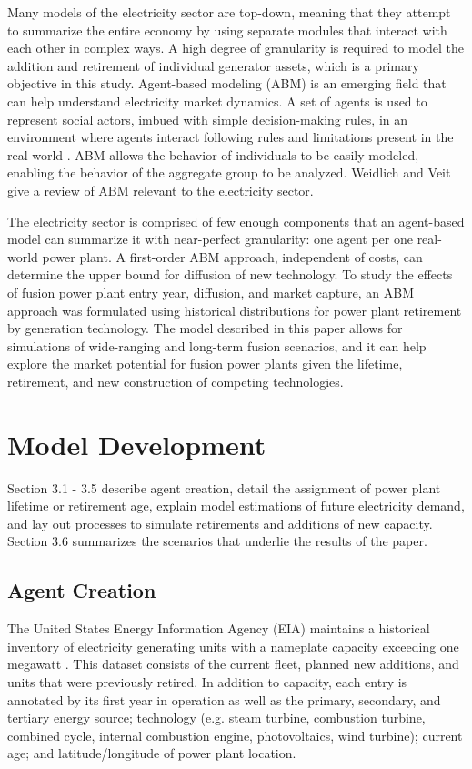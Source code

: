 \documentclass[review]{elsarticle}
\begin{document}
Many models of the electricity sector are top-down, meaning that they attempt to summarize the entire economy by using separate modules that interact with each other in complex ways. A high degree of granularity is required to model the addition and retirement of individual generator assets, which is a primary objective in this study. Agent-based modeling (ABM) is an emerging field that can help understand electricity market dynamics. A set of agents is used to represent social actors, imbued with simple decision-making rules, in an environment where agents interact following rules and limitations present in the real world \citep{Gilbert2008}.  ABM allows the behavior of individuals to be easily modeled, enabling the behavior of the aggregate group to be analyzed. Weidlich and Veit \citep{Widlich2008} give a review of ABM relevant to the electricity sector.

The electricity sector is comprised of few enough components that an agent-based model can summarize it with near-perfect granularity: one agent per one real-world power plant. A first-order ABM approach, independent of costs, can determine the upper bound for diffusion of new technology. To study the effects of fusion power plant entry year, diffusion, and market capture, an ABM approach was formulated using historical distributions for power plant retirement by generation technology. The model described in this paper allows for simulations of wide-ranging and long-term fusion scenarios, and it can help explore the market potential for fusion power plants given the lifetime, retirement, and new construction of competing technologies.

\section{Model Development}

Section 3.1 - 3.5 describe agent creation, detail the assignment of power plant lifetime or retirement age, explain model estimations of future electricity demand, and lay out processes to simulate retirements and additions of new capacity. Section 3.6 summarizes the scenarios that underlie the results of the paper.

\subsection{Agent Creation}

The United States Energy Information Agency (EIA) maintains a historical inventory of electricity generating units with a nameplate capacity exceeding one megawatt \citep{EIA2016}. This dataset consists of the current fleet, planned new additions, and units that were previously retired. In addition to capacity, each entry is annotated by its first year in operation as well as the primary, secondary, and tertiary energy source; technology (e.g. steam turbine, combustion turbine, combined cycle, internal combustion engine, photovoltaics, wind turbine); current age; and latitude/longitude of power plant location.
\end{document}
